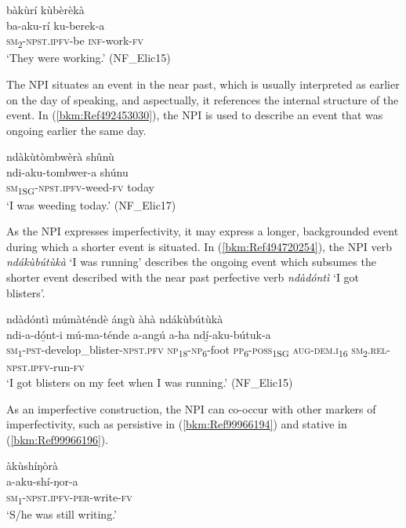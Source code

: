 \ea
\label{bkm:Ref98834890}
bàkùrí kùbèrèkà\\
\gll ba-aku-rí    ku-berek-a\\
\textsc{sm}\textsubscript{2}-\textsc{npst}.\textsc{ipfv}-be  \textsc{inf}-work-\textsc{fv}\\
\glt ‘They were working.’ (NF\_Elic15)
\z

The NPI situates an event in the near past, which is usually interpreted as earlier on the day of speaking, and aspectually, it references the internal structure of the event. In (\ref{bkm:Ref492453030}), the NPI is used to describe an event that was ongoing earlier the same day.

\ea
\label{bkm:Ref492453030}
ndàkùtòmbwèrà shûnù\\
\gll ndi-aku-tombwer-a  shúnu\\
\textsc{sm}\textsubscript{1SG}-\textsc{npst}.\textsc{ipfv}-weed-\textsc{fv}  today\\
\glt ‘I was weeding today.’ (NF\_Elic17)
\z

As the NPI expresses imperfectivity, it may express a longer, backgrounded event during which a shorter event is situated. In (\ref{bkm:Ref494720254}), the NPI verb \textit{ndákùbútùkà} ‘I was running’ describes the ongoing event which subsumes the shorter event described with the near past perfective verb \textit{ndàdóntì} ‘I got blisters’.

\ea
\label{bkm:Ref494720254}
ndàdóntì múmàténdè ángù àhà ndákùbútùkà\\
\gll ndi-a-dó̲nt-i          mú-ma-ténde  a-angú a-ha    ndí̲-aku-bútuk-a\\
\textsc{sm}\textsubscript{1}-\textsc{pst}-develop\_blister-\textsc{npst}.\textsc{pfv}  \textsc{np}\textsubscript{18}-\textsc{np}\textsubscript{6}-foot  \textsc{pp}\textsubscript{6}-\textsc{poss}\textsubscript{1SG}
\textsc{aug}-\textsc{dem}.\textsc{i}\textsubscript{16}  \textsc{sm}\textsubscript{2}.\textsc{rel}-\textsc{npst}.\textsc{ipfv}-run-\textsc{fv}\\
\glt ‘I got blisters on my feet when I was running.’ (NF\_Elic15)
\z

As an imperfective construction, the NPI can co-occur with other markers of imperfectivity, such as persistive in (\ref{bkm:Ref99966194}) and stative in (\ref{bkm:Ref99966196}).

\ea
\label{bkm:Ref99966194}
\glll àkùshíŋòrà\\
a-aku-shí-ŋor-a\\
\textsc{sm}\textsubscript{1}-\textsc{npst}.\textsc{ipfv}-\textsc{per}-write-\textsc{fv}\\
\glt ‘S/he was still writing.’
\z

